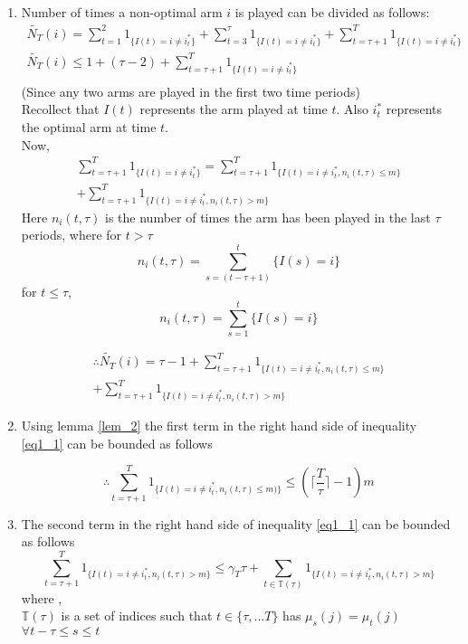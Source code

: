 \documentclass[compress, serif, onlymath, professionalfonts]{beamer}
\begin{document}
\begin{frame}[t,allowframebreaks]

\begin{enumerate}

\item Number of times a non-optimal arm $i$ is played can be divided as follows:
\begin{align*}
\tilde{N_T}(i)=\sum_{t=1}^{2}1_{\{I(t)=i\neq i^*_t\}}+\sum_{t=3}^{\tau}1_{\{I(t)=i\neq i^*_t\}}+\sum_{t=\tau+1}^{T}1_{\{I(t)=i\neq i^*_t\}}\\
\tilde{N_T}(i)\leq 1+(\tau-2)+\sum_{t=\tau+1}^{T}1_{\{I(t)=i\neq i^*_t\}}\\
\end{align*}
(Since any two arms are played in the first two time periods)\\
Recollect that $I(t)$ represents the arm played at time $t$. Also $i^*_t$ represents the optimal arm at time $t$.
\\Now,
\begin{multline*}
\sum_{t=\tau+1}^{T}1_{\{I(t)=i\neq i^*_t\}}=\sum_{t=\tau+1}^{T}1_{\{I(t)=i\neq i^*_t,n_i(t,\tau)\leq m\}}
\\+\sum_{t=\tau+1}^{T}1_{\{I(t)=i\neq i^*_t,n_i(t,\tau)> m\}}
\end{multline*}
Here $n_i(t,\tau)$ is the number of times the arm has been played in the last $\tau$ periods, where for $t>\tau$
$$n_i(t,\tau) = \sum_{s=(t-\tau+1)}^{t}\{I(s)=i\}$$
for $t\leq \tau $,
$$n_i(t,\tau) = \sum_{s=1}^{t}\{I(s)=i\}$$

\begin{multline}
\label{eq1_1}
\therefore \tilde{N_T}(i)=\tau-1+\sum_{t=\tau+1}^{T}1_{\{I(t)=i\neq i^*_t, n_i(t,\tau)\leq m\}}
\\+\sum_{t=\tau+1}^{T}1_{\{I(t)=i\neq i^*_t, n_i(t,\tau)> m\}}
\end{multline}
\item Using  lemma \ref{lem_2} the first term in the right hand side of inequality \ref{eq1_1} can be bounded as follows

\begin{equation}\label{eq3_1}
\therefore \sum_{t=\tau+1}^{T}1_{\{I(t)=i\neq i^*_t, n_i(t,\tau)\leq  m)\}} \leq ( \lceil{\frac{T}{\tau}}\rceil-1)m
\end{equation}


\item The second term in the right hand side of inequality \ref{eq1_1} can be bounded as follows
\begin{equation}
\label{eq4_1_g}
\sum_{t=\tau+1}^{T}1_{\{I(t)=i\neq i^*_t, n_i(t,\tau)> m\}} \leq \gamma_T\tau + \sum_{t\in \mathbb{T}(\tau)}1_{\{I(t)=i\neq i^*_t, n_i(t,\tau)> m\}}
\end{equation}
where ,\\
$\mathbb{T}(\tau)$ is a set of indices such that $t \in \{\tau,...T\}$ has $\mu_s(j)=\mu_t(j)$ \\  $\forall t- \tau \leq s \leq t$


\end{enumerate}
\end{frame}
\end{document}
